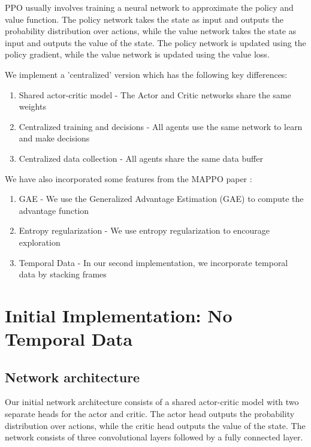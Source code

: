 \documentclass{article}
\begin{document}
PPO usually involves training a neural network to approximate the policy and value function. The policy
network takes the state as input and outputs the probability distribution over actions, while the value network
takes the state as input and outputs the value of the state. The policy network is updated using the policy gradient,
while the value network is updated using the value loss.

\pagebreak

We implement a 'centralized' version which has the following key differences:
\begin{enumerate}
  \item Shared actor-critic model - The Actor and Critic networks share the same weights
  \item Centralized training and decisions - All agents use the same network to learn and make decisions
  \item Centralized data collection - All agents share the same data buffer
\end{enumerate}

We have also incorporated some features from the MAPPO paper \cite{DBLP:journals/corr/abs-2103-01955}:
\begin{enumerate}
  \item GAE - We use the Generalized Advantage Estimation (GAE) to compute the advantage function
  \item Entropy regularization - We use entropy regularization to encourage exploration
  \item Temporal Data - In our second implementation, we incorporate temporal data by stacking frames
\end{enumerate}


\section{Initial Implementation: No Temporal Data}

\subsection{Network architecture}
Our initial network architecture consists of a shared actor-critic model with two separate heads for the actor and critic.
The actor head outputs the probability distribution over actions, while the critic head outputs the value of the state.
The network consists of three convolutional layers followed by a fully connected layer.
\end{document}
